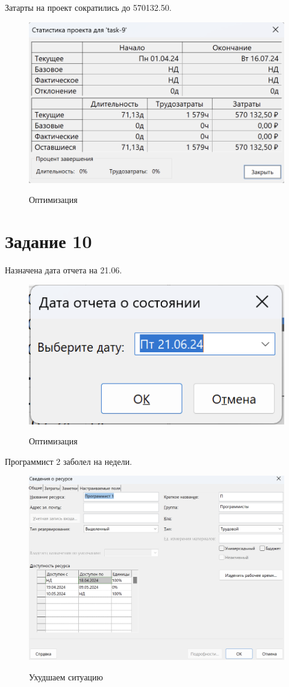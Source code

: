 Затарты на проект сократились до 570132.50.

\begin{figure}[ht!]
	\includegraphics[width=0.75\linewidth]{assets/images/9.4-zatrat.png}
	\label{fig:r2}
	\caption{Оптимизация}
\end{figure}
\FloatBarrier

\section{Задание 10}

Назначена дата отчета на 21.06.

\begin{figure}[ht!]
	\includegraphics[width=0.75\linewidth]{assets/images/10.1-othet.png}
	\label{fig:r2}
	\caption{Оптимизация}
\end{figure}
\FloatBarrier

Программист 2 заболел на недели.

\begin{figure}[ht!]
	\includegraphics[width=0.75\linewidth]{assets/images/10.2-progdie.png}
	\label{fig:r2}
	\caption{Ухудшаем ситуацию}
\end{figure}
\FloatBarrier

